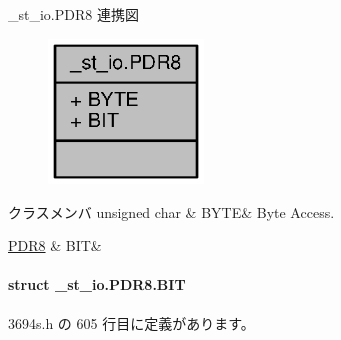 \+\_\+st\+\_\+io.\+P\+D\+R8 連携図
\nopagebreak
\begin{figure}[H]
\begin{center}
\leavevmode
\includegraphics[width=117pt]{dd/d42/union__st__io_8PDR8__coll__graph}
\end{center}
\end{figure}
\begin{DoxyFields}{クラスメンバ}
unsigned char\label{3694s_8h_ae409eb2ba6eb6801f52763ae370c350e}
&
B\+Y\+T\+E&
Byte Access. \\
\hline

\hyperlink{3694s_8h_df/d0e/struct__st__io_8PDR8_8BIT}{P\+D\+R8}\label{3694s_8h_adb957fdc8000e1eef04a243f5199aa52}
&
B\+I\+T&
\\
\hline

\end{DoxyFields}
\label{struct__st__io_8PDR8_8BIT}
\paragraph{struct \+\_\+st\+\_\+io.\+P\+D\+R8.\+B\+I\+T}


 3694s.\+h の 605 行目に定義があります。



